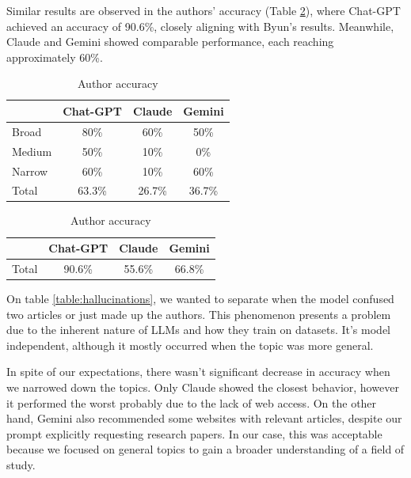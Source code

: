 \documentclass[runningheads]{llncs}
\begin{document}
Similar results are observed in the authors’ accuracy (Table \ref{table:author_acc}), where Chat-GPT achieved an accuracy of 90.6\%, closely aligning with Byun’s results. Meanwhile, Claude and Gemini showed comparable performance, each reaching approximately 60\%.

\begin{table}[ht]
    \footnotesize
    \centering
    \begin{minipage}{0.45\textwidth}
        \centering
        \begin{tabular}{ l c c c }
            \hline
             & \textbf{Chat-GPT} & \textbf{Claude} & \textbf{Gemini} \\
            \hline
            Broad & 80\% & 60\% & 50\% \\
            Medium & 50\% & 10\% & 0\% \\
            Narrow & 60\% & 10\% & 60\% \\
            Total & 63.3\% & 26.7\% & 36.7\% \\
            \hline
        \end{tabular}
        \caption{Title accuracy}
        \label{table:title_acc}
    \end{minipage}
    \hfill
    \begin{minipage}{0.45\textwidth}
        \centering
        \begin{tabular}{ l c c c }
            \hline
             & \textbf{Chat-GPT} & \textbf{Claude} & \textbf{Gemini} \\
            \hline
            Total & 90.6\% & 55.6\% & 66.8\% \\
            \hline
        \end{tabular}
        \caption{Author accuracy}
        \label{table:author_acc}
    \end{minipage}
\end{table}

On table \ref{table:hallucinations}, we wanted to separate when the model confused two articles or just made up the authors. This phenomenon presents a problem due to the inherent nature of LLMs and how they train on datasets. It's model independent, although it mostly occurred when the topic was more general.

In spite of our expectations, there wasn't significant decrease in accuracy when we narrowed down the topics. Only Claude showed the closest behavior, however it performed the worst probably due to the lack of web access. On the other hand, Gemini also recommended some websites with relevant articles, despite our prompt explicitly requesting research papers. In our case, this was acceptable because we focused on general topics to gain a broader understanding of a field of study.
\end{document}
